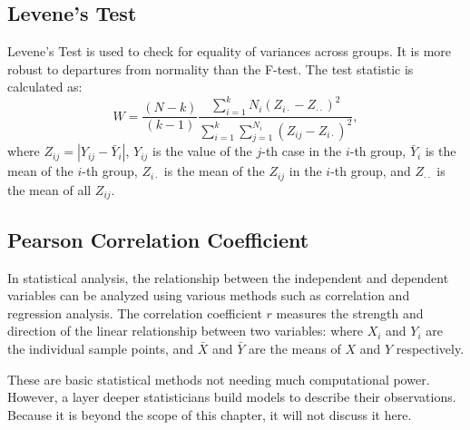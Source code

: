 \subsection{Levene’s Test}
Levene’s Test is used to check for equality of variances across groups. It is more robust to departures from normality than the F-test. The test statistic is calculated as:
\begin{equation}
W = \frac{(N - k)}{(k - 1)} \frac{\sum_{i=1}^k N_i (Z_{i\cdot} - Z_{\cdot\cdot})^2}{\sum_{i=1}^k \sum_{j=1}^{N_i} (Z_{ij} - Z_{i\cdot})^2},
\end{equation}
where $Z_{ij} = |Y_{ij} - \bar{Y}_i|$, $Y_{ij}$ is the value of the $j$-th case in the $i$-th group, $\bar{Y}_i$ is the mean of the $i$-th group, $Z_{i\cdot}$ is the mean of the $Z_{ij}$ in the $i$-th group, and $Z_{\cdot\cdot}$ is the mean of all $Z_{ij}$.


\subsection{Pearson Correlation Coefficient}\label{Pearson Correlation Coefficient}
In statistical analysis, the relationship between the independent and dependent variables can be analyzed using various methods such as correlation and regression analysis. The correlation coefficient $r$ measures the strength and direction of the linear relationship between two variables:
where $X_i$ and $Y_i$ are the individual sample points, and $\bar{X}$ and $\bar{Y}$ are the means of $X$ and $Y$ respectively.

\emptyline
These are basic statistical methods not needing much computational power. However, a layer deeper statisticians build models to describe their observations.  
Because it is beyond the scope of this chapter, it will not discuss it here.